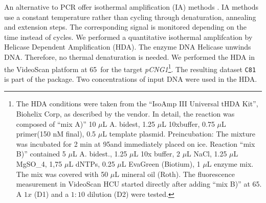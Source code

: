 An alternative to PCR offer isothermal amplification (IA) methods 
\citep{rodiger_nucleic_2014}. IA methods use a constant temperature rather than 
cycling through denaturation, annealing and extension steps. The corresponding 
signal is monitored depending on the time instead of cycles. We performed a 
quantitative isothermal amplifcation by Helicase Dependent Amplification (HDA). 
The enzyme DNA Helicase unwinds DNA. Therefore, no thermal denaturation is 
needed. We performed the HDA in the VideoScan platform 
\citep{rodiger_highly_2013} at 65~\textcelsius for the target 
\textit{pCNG1}\footnote{The HDA conditions were taken from the ``IsoAmp III 
Universal tHDA Kit'', Biohelix Corp, as described by the vendor. In detail, the 
reaction was composed of ``mix A)'' 10 $\mu$L A. bidest, 1.25 $\mu$L 10xbuffer, 
0.75 $\mu$L primer(150 nM final), 0.5 $\mu$L template plasmid. Preincubation: 
The mixture was incubated for 2 min at 95\textcelsius and immediately placed on 
ice. Reaction ``mix B)'' contained 5 $\mu$L A. bidest., 1.25 $\mu$L 10x buffer, 
2 $\mu$L NaCl, 1.25 $\mu$L MgSO_{4}, 1,75 $\mu$L dNTPs, 0.25 $\mu$L EvaGreen 
(Biotium), 1 $\mu$L enzyme mix. The mix was covered with 50 $\mu$L mineral oil 
(Roth). The fluorescence measurement in VideoScan HCU started directly after 
adding ``mix B)'' at 65\textcelsius. A $1x$ (D1) and a $1:10$ dilution (D2) were 
tested.}. The resulting dataset \texttt{C81} is part of the  
package. Two concentrations of input DNA were used in the HDA.

